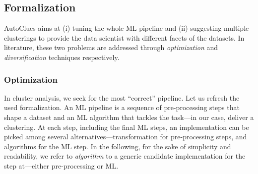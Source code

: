 \subsection{Formalization}
\label{clustering-ssec:formalization}

AutoClues aims at (i) tuning the whole ML pipeline and (ii) suggesting multiple clusterings to provide the data scientist with different facets of the datasets.
%
In literature, these two problems are addressed through \textit{optimization} and \textit{diversification} techniques respectively.


%
%
\subsubsection{Optimization}
In cluster analysis, we seek for the most ``correct'' pipeline.
Let us refresh the used formalization.
An ML pipeline is a sequence of pre-processing steps that shape a dataset and an ML algorithm that tackles the task---in our case, deliver a clustering.
At each step, including the final ML steps, an implementation can be picked among several alternatives---transformation for pre-processing steps, and algorithms for the ML step.
In the following, for the sake of simplicity and readability, we refer to \textit{algorithm} to a generic candidate implementation for the step at---either pre-processing or ML.

